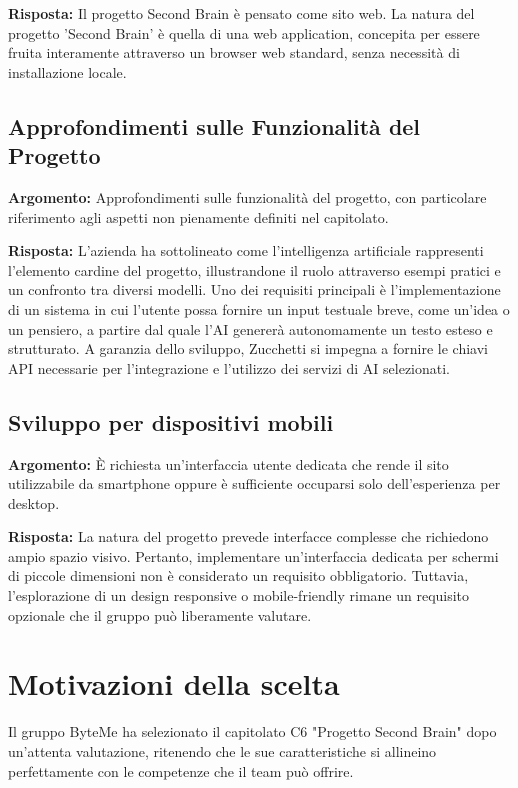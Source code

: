 \documentclass[11pt,a4paper]{article}
\begin{document}
\textbf{Risposta:} Il progetto Second Brain è pensato come sito web. La natura del progetto 'Second Brain' è quella di una web application, concepita per essere fruita interamente attraverso un browser web standard, senza necessità di installazione locale.

\subsection{Approfondimenti sulle Funzionalità del Progetto}
\textbf{Argomento:} Approfondimenti sulle funzionalità del progetto, con particolare riferimento agli aspetti non pienamente definiti nel capitolato.

\textbf{Risposta:} L'azienda ha sottolineato come l'intelligenza artificiale rappresenti l'elemento cardine del progetto, illustrandone il ruolo attraverso esempi pratici e un confronto tra diversi modelli. Uno dei requisiti principali è l'implementazione di un sistema in cui l'utente possa fornire un input testuale breve, come un'idea o un pensiero, a partire dal quale l'AI genererà autonomamente un testo esteso e strutturato. A garanzia dello sviluppo, Zucchetti si impegna a fornire le chiavi API necessarie per l'integrazione e l'utilizzo dei servizi di AI selezionati.

\subsection{Sviluppo per dispositivi mobili}
\textbf{Argomento:} È richiesta un'interfaccia utente dedicata che rende il sito utilizzabile da smartphone oppure è sufficiente occuparsi solo dell'esperienza per desktop.

\textbf{Risposta:} La natura del progetto prevede interfacce complesse che richiedono ampio spazio visivo. Pertanto, implementare un'interfaccia dedicata per schermi di piccole dimensioni non è considerato un requisito obbligatorio. Tuttavia, l'esplorazione di un design responsive o mobile-friendly rimane un requisito opzionale che il gruppo può liberamente valutare.

\newpage
\section{Motivazioni della scelta}
Il gruppo ByteMe ha selezionato il capitolato C6 "Progetto Second Brain" dopo un'attenta valutazione, ritenendo che le sue caratteristiche si allineino perfettamente con le competenze che il team può offrire.
\end{document}
